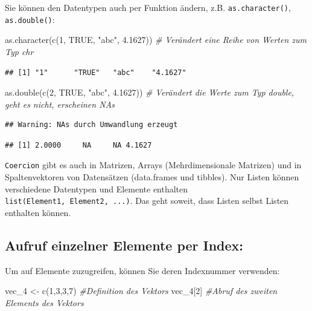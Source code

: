 \documentclass[
]{book}
\newenvironment{Shaded}{\begin{snugshade}}{\end{snugshade}}
\newcommand{\CommentTok}[1]{\textcolor[rgb]{0.56,0.35,0.01}{\textit{#1}}}
\newcommand{\ConstantTok}[1]{\textcolor[rgb]{0.00,0.00,0.00}{#1}}
\newcommand{\DecValTok}[1]{\textcolor[rgb]{0.00,0.00,0.81}{#1}}
\newcommand{\FloatTok}[1]{\textcolor[rgb]{0.00,0.00,0.81}{#1}}
\newcommand{\FunctionTok}[1]{\textcolor[rgb]{0.00,0.00,0.00}{#1}}
\newcommand{\NormalTok}[1]{#1}
\newcommand{\OtherTok}[1]{\textcolor[rgb]{0.56,0.35,0.01}{#1}}
\newcommand{\StringTok}[1]{\textcolor[rgb]{0.31,0.60,0.02}{#1}}
\theoremstyle{definition}
\theoremstyle{definition}
\theoremstyle{definition}
\theoremstyle{definition}
\theoremstyle{remark}
\begin{document}
Sie können den Datentypen auch per Funktion ändern, z.B. \texttt{as.character()}, \texttt{as.double()}:

\begin{Shaded}
\begin{Highlighting}[]
\FunctionTok{as.character}\NormalTok{(}\FunctionTok{c}\NormalTok{(}\DecValTok{1}\NormalTok{, }\ConstantTok{TRUE}\NormalTok{, }\StringTok{"abc"}\NormalTok{, }\FloatTok{4.1627}\NormalTok{))  }\CommentTok{\# Verändert eine Reihe von Werten zum Typ chr}
\end{Highlighting}
\end{Shaded}

\begin{verbatim}
## [1] "1"      "TRUE"   "abc"    "4.1627"
\end{verbatim}

\begin{Shaded}
\begin{Highlighting}[]
\FunctionTok{as.double}\NormalTok{(}\FunctionTok{c}\NormalTok{(}\DecValTok{2}\NormalTok{, }\ConstantTok{TRUE}\NormalTok{, }\StringTok{"abc"}\NormalTok{, }\FloatTok{4.1627}\NormalTok{))    }\CommentTok{\# Verändert die Werte zum Typ double, geht es nicht, erscheinen NAs}
\end{Highlighting}
\end{Shaded}

\begin{verbatim}
## Warning: NAs durch Umwandlung erzeugt
\end{verbatim}

\begin{verbatim}
## [1] 2.0000     NA     NA 4.1627
\end{verbatim}

\texttt{Coercion} gibt es auch in Matrizen, Arrays (Mehrdimensionale Matrizen) und in Spaltenvektoren von Datensätzen (data.frames und tibbles). Nur Listen können verschiedene Datentypen und Elemente enthalten \texttt{list(Element1,\ Element2,\ ...)}. Das geht soweit, dass Listen selbst Listen enthalten können.

\hypertarget{aufruf-einzelner-elemente-per-index}{%
\subsection{Aufruf einzelner Elemente per Index:}\label{aufruf-einzelner-elemente-per-index}}

Um auf Elemente zuzugreifen, können Sie deren Indexnummer verwenden:

\begin{Shaded}
\begin{Highlighting}[]
\NormalTok{vec\_4 }\OtherTok{\textless{}{-}} \FunctionTok{c}\NormalTok{(}\DecValTok{1}\NormalTok{,}\DecValTok{3}\NormalTok{,}\DecValTok{3}\NormalTok{,}\DecValTok{7}\NormalTok{)   }\CommentTok{\#Definition des Vektors}
\NormalTok{vec\_4[}\DecValTok{2}\NormalTok{]              }\CommentTok{\#Abruf des zweiten Elements des Vektors}
\end{Highlighting}
\end{Shaded}
\end{document}
